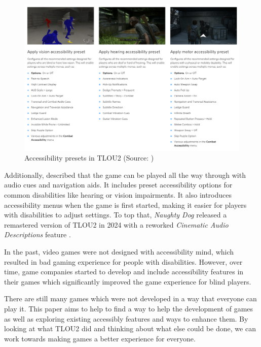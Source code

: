 \documentclass[sigconf,natbib=false,10pt]{acmart}
\begin{document}
	\begin{figure}[ht]
		\centering
		\includegraphics[scale=0.6,width=\textwidth]{assets/tlou-accessibility-presets.png}
		\caption{Accessibility presets in TLOU2 (Source: \textcite{playstation_last_2020-1})}
		\label{fig:tlou-accessibility-presets}
	\end{figure}

	Additionally, \textcite{dale_last_2024} described that the game can be played all the way through with audio cues and navigation aids.
	It includes preset accessibility options for common disabilities like hearing or vision impairments. 
	It also introduces accessibility menus when the game is first started, making it easier for players with disabilities to adjust settings.
	To top that, \emph{Naughty Dog} released a remastered version of TLOU2 in 2024 with a reworked \emph{Cinematic Audio Descriptions} feature \cite{playstation_last_2024}.
	
	In the past, video games were not designed with accessibility mind, which resulted in bad gaming experience for people with disabilities. 
	However, over time, game companies started to develop and include accessibility features in their games which significantly improved the game experience for blind players.
	
	There are still many games which were not developed in a way that everyone can play it.
	This paper aims to help to find a way to help the development of games as well as exploring existing accessibly features and ways to enhance them. 
	By looking at what TLOU2 did and thinking about what else could be done, we can work towards making games a better experience for everyone.
	
\end{document}
